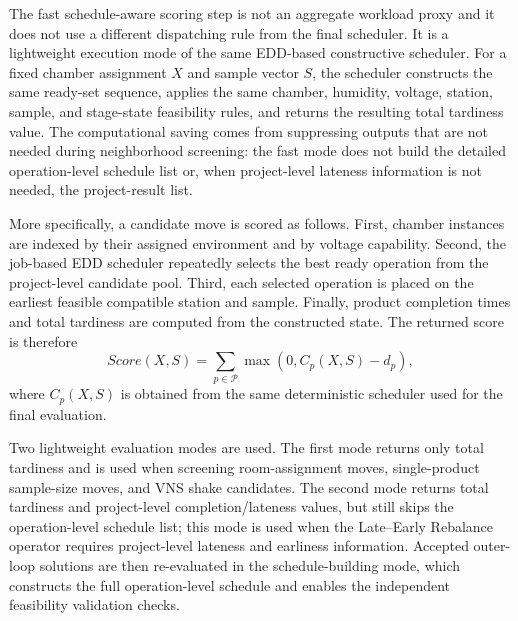 

The fast schedule-aware scoring step is not an aggregate workload proxy and it
does not use a different dispatching rule from the final scheduler. It is a
lightweight execution mode of the same EDD-based constructive scheduler. For a
fixed chamber assignment \(X\) and sample vector \(S\), the scheduler constructs
the same ready-set sequence, applies the same chamber, humidity, voltage,
station, sample, and stage-state feasibility rules, and returns the resulting
total tardiness value. The computational saving comes from suppressing outputs
that are not needed during neighborhood screening: the fast mode does not build
the detailed operation-level schedule list or, when project-level lateness
information is not needed, the project-result list.

More specifically, a candidate move is scored as follows. First, chamber
instances are indexed by their assigned environment and by voltage capability.
Second, the job-based EDD scheduler repeatedly selects the best ready operation
from the project-level candidate pool. Third, each selected operation is placed
on the earliest feasible compatible station and sample. Finally, product
completion times and total tardiness are computed from the constructed state.
The returned score is therefore
\[
Score(X,S)=\sum_{p\in\mathcal{P}}\max(0,C_p(X,S)-d_p),
\]
where \(C_p(X,S)\) is obtained from the same deterministic scheduler used for
the final evaluation.

Two lightweight evaluation modes are used. The first mode returns only total
tardiness and is used when screening room-assignment moves, single-product
sample-size moves, and VNS shake candidates. The second mode returns total
tardiness and project-level completion/lateness values, but still skips the
operation-level schedule list; this mode is used when the Late--Early Rebalance
operator requires project-level lateness and earliness information. Accepted
outer-loop solutions are then re-evaluated in the schedule-building mode, which
constructs the full operation-level schedule and enables the independent
feasibility validation checks.

